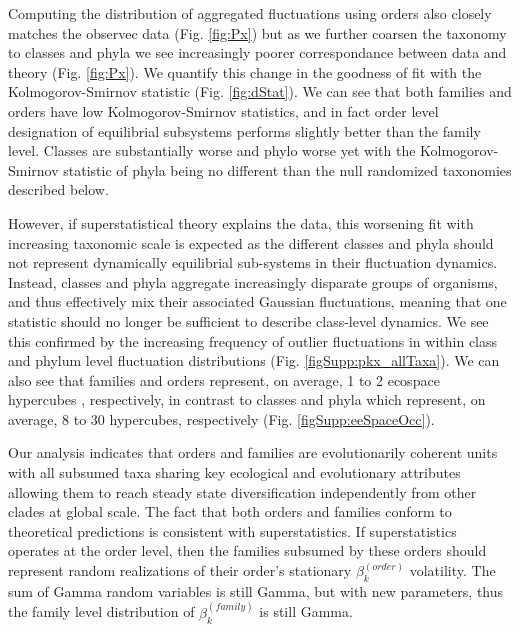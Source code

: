 \documentclass[12pt]{article}
\let\citep=\cite
\begin{document}
Computing the distribution of aggregated fluctuations using orders
also closely matches the observec data (Fig. \ref{fig:Px}) but as we
further coarsen the taxonomy to classes and phyla we see increasingly
poorer correspondance between data and theory (Fig. \ref{fig:Px}). We
quantify this change in the goodness of fit with the
Kolmogorov-Smirnov statistic (Fig. \ref{fig:dStat}). We can see that
both families and orders have low Kolmogorov-Smirnov statistics, and
in fact order level designation of equilibrial subsystems performs
slightly better than the family level. Classes are substantially worse
and phylo worse yet with the Kolmogorov-Smirnov statistic of phyla
being no different than the null randomized taxonomies described
below.

However, if superstatistical theory explains the data, this worsening
fit with increasing taxonomic scale is expected as the different
classes and phyla should not represent dynamically equilibrial
sub-systems in their fluctuation dynamics. Instead, classes and phyla
aggregate increasingly disparate groups of organisms, and thus
effectively mix their associated Gaussian fluctuations, meaning that
one statistic should no longer be sufficient to describe class-level
dynamics. We see this confirmed by the increasing frequency of outlier
fluctuations in within class and phylum level fluctuation
distributions (Fig. \ref{figSupp:pkx_allTaxa}). We can also see that
families and orders represent, on average, 1 to 2 ecospace hypercubes
\citep{bambach1983, bambach2007, bush2007}, respectively, in contrast
to classes and phyla which represent, on average, 8 to 30 hypercubes,
respectively (Fig. \ref{figSupp:eeSpaceOcc}).


Our analysis indicates that orders and families are evolutionarily
coherent units with all subsumed taxa sharing key ecological
and evolutionary attributes allowing them to reach steady state
diversification independently from other clades at global scale. The
fact that both orders and families conform to theoretical predictions
is consistent with superstatistics. If superstatistics operates at the
order level, then the families subsumed by these orders should
represent random realizations of their order's stationary $\beta_k^{(order)}$
volatility. The sum of Gamma random variables is still Gamma, but with
new parameters, thus the family level distribution of
$\beta_k^{(family)}$ is still Gamma.
\end{document}
